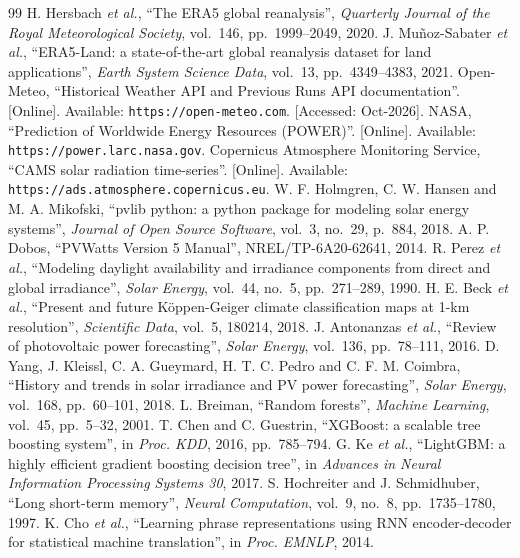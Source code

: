 \documentclass[12pt]{report}
\begin{document}
\begin{thebibliography}{99}
 H. Hersbach \textit{et al.}, ``The ERA5 global reanalysis'', \textit{Quarterly Journal of the Royal Meteorological Society}, vol.~146, pp.~1999--2049, 2020.
 J. Muñoz-Sabater \textit{et al.}, ``ERA5-Land: a state-of-the-art global reanalysis dataset for land applications'', \textit{Earth System Science Data}, vol.~13, pp.~4349--4383, 2021.
 Open-Meteo, ``Historical Weather API and Previous Runs API documentation''. [Online]. Available: \texttt{https://open-meteo.com}. [Accessed: Oct-2026].
 NASA, ``Prediction of Worldwide Energy Resources (POWER)''. [Online]. Available: \texttt{https://power.larc.nasa.gov}.
 Copernicus Atmosphere Monitoring Service, ``CAMS solar radiation time-series''. [Online]. Available: \texttt{https://ads.atmosphere.copernicus.eu}.
 W. F. Holmgren, C. W. Hansen and M. A. Mikofski, ``pvlib python: a python package for modeling solar energy systems'', \textit{Journal of Open Source Software}, vol.~3, no.~29, p.~884, 2018.
 A. P. Dobos, ``PVWatts Version 5 Manual'', NREL/TP-6A20-62641, 2014.
 R. Perez \textit{et al.}, ``Modeling daylight availability and irradiance components from direct and global irradiance'', \textit{Solar Energy}, vol.~44, no.~5, pp.~271--289, 1990.
 H. E. Beck \textit{et al.}, ``Present and future Köppen-Geiger climate classification maps at 1-km resolution'', \textit{Scientific Data}, vol.~5, 180214, 2018.
 J. Antonanzas \textit{et al.}, ``Review of photovoltaic power forecasting'', \textit{Solar Energy}, vol.~136, pp.~78--111, 2016.
 D. Yang, J. Kleissl, C. A. Gueymard, H. T. C. Pedro and C. F. M. Coimbra, ``History and trends in solar irradiance and PV power forecasting'', \textit{Solar Energy}, vol.~168, pp.~60--101, 2018.
 L. Breiman, ``Random forests'', \textit{Machine Learning}, vol.~45, pp.~5--32, 2001.
 T. Chen and C. Guestrin, ``XGBoost: a scalable tree boosting system'', in \textit{Proc. KDD}, 2016, pp.~785--794.
 G. Ke \textit{et al.}, ``LightGBM: a highly efficient gradient boosting decision tree'', in \textit{Advances in Neural Information Processing Systems 30}, 2017.
 S. Hochreiter and J. Schmidhuber, ``Long short-term memory'', \textit{Neural Computation}, vol.~9, no.~8, pp.~1735--1780, 1997.
 K. Cho \textit{et al.}, ``Learning phrase representations using RNN encoder-decoder for statistical machine translation'', in \textit{Proc. EMNLP}, 2014.

\end{thebibliography}
\end{document}
